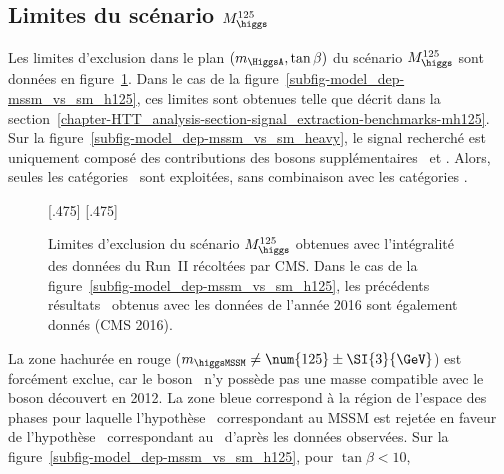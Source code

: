 \subsection{Limites du scénario $M_{\higgs}^{125}$}
Les limites d'exclusion dans le plan $(m_{\HiggsA},\tan\beta)$ du scénario $M_{\higgs}^{125}$
sont données en figure~\ref{fig-model_dep}.
Dans le cas de la figure~\ref{subfig-model_dep-mssm_vs_sm_h125},
ces limites sont obtenues telle que décrit dans la section~\ref{chapter-HTT_analysis-section-signal_extraction-benchmarks-mh125}.
Sur la figure~\ref{subfig-model_dep-mssm_vs_sm_heavy},
le signal recherché est uniquement composé des contributions des bosons supplémentaires \Higgs\ et \HiggsA.
Alors, seules les catégories \CATbsm\ sont exploitées, sans combinaison avec les catégories \CATsm.
\begin{figure}[h]
\centering

[.475\textwidth]
{}
\hfill
{}[.475\textwidth]
{}

\caption[Limites d'exclusion du scénario $M_{\higgs}^{125}$.]{Limites d'exclusion du scénario $M_{\higgs}^{125}$ obtenues avec l'intégralité des données du Run~II récoltées par CMS. Dans le cas de la figure~\ref{subfig-model_dep-mssm_vs_sm_h125}, les précédents résultats~\cite{CMS-PAS-HIG-17-020} obtenus avec les données de l'année 2016 sont également donnés (CMS 2016).}
\label{fig-model_dep}
\end{figure}
\par
La zone hachurée en rouge ($m_{\higgsMSSM}\neq\num{125}\pm\SI{3}{\GeV}$) est forcément exclue,
car le boson \higgsMSSM\ n'y possède pas une masse compatible avec le boson découvert en 2012.
La zone bleue correspond à la région de l'espace des phases pour laquelle
l'hypothèse \hypSB\ correspondant au MSSM
est rejetée en faveur de
l'hypothèse \hypB\ correspondant au \SM\
d'après les données observées.
Sur la figure~\ref{subfig-model_dep-mssm_vs_sm_h125},
pour $\tan\beta<\num{10}$,
